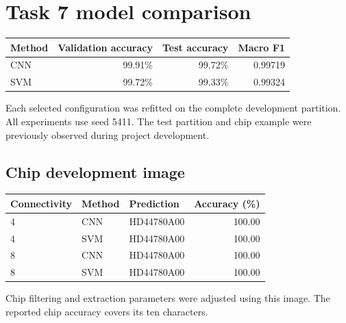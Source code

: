 \section{Task 7 model comparison}
\begin{center}\begin{tabular}{lrrr}\toprule
Method & Validation accuracy & Test accuracy & Macro F1 \\\midrule
CNN & 99.91\% & 99.72\% & 0.99719 \\
SVM & 99.72\% & 99.33\% & 0.99324 \\
\bottomrule\end{tabular}\end{center}
Each selected configuration was refitted on the complete development partition. All experiments use seed 5411. The test partition and chip example were previously observed during project development.
\subsection{Chip development image}
\begin{center}\begin{tabular}{lllr}\toprule
Connectivity & Method & Prediction & Accuracy (\%) \\\midrule
4 & CNN & HD44780A00 & 100.00 \\
4 & SVM & HD44780A00 & 100.00 \\
8 & CNN & HD44780A00 & 100.00 \\
8 & SVM & HD44780A00 & 100.00 \\
\bottomrule\end{tabular}\end{center}
Chip filtering and extraction parameters were adjusted using this image. The reported chip accuracy covers its ten characters.
